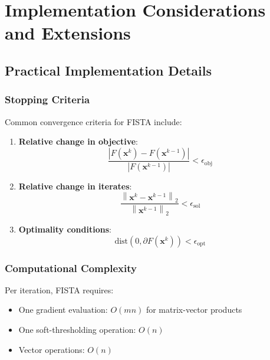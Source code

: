 \documentclass[12pt]{article}
\renewcommand{\vec}[1]{\mathbf{#1}}
\newcommand{\norm}[1]{\left\lVert#1\right\rVert}
\newcommand{\abs}[1]{\left|#1\right|}
\begin{document}
\newpage
\section{Implementation Considerations and Extensions}

\subsection{Practical Implementation Details}

\subsubsection{Stopping Criteria}

Common convergence criteria for FISTA include:
\begin{enumerate}
    \item \textbf{Relative change in objective}:
          \begin{equation}
              \frac{\abs{F(\vec{x}^k) - F(\vec{x}^{k-1})}}{\abs{F(\vec{x}^{k-1})}} < \epsilon_{\text{obj}}
          \end{equation}

    \item \textbf{Relative change in iterates}:
          \begin{equation}
              \frac{\norm{\vec{x}^k - \vec{x}^{k-1}}_2}{\norm{\vec{x}^{k-1}}_2} < \epsilon_{\text{sol}}
          \end{equation}

    \item \textbf{Optimality conditions}:
          \begin{equation}
              \text{dist}(0, \partial F(\vec{x}^k)) < \epsilon_{\text{opt}}
          \end{equation}
\end{enumerate}

\subsubsection{Computational Complexity}

Per iteration, FISTA requires:
\begin{itemize}
    \item One gradient evaluation: $O(mn)$ for matrix-vector products
    \item One soft-thresholding operation: $O(n)$
    \item Vector operations: $O(n)$
\end{itemize}
\end{document}
